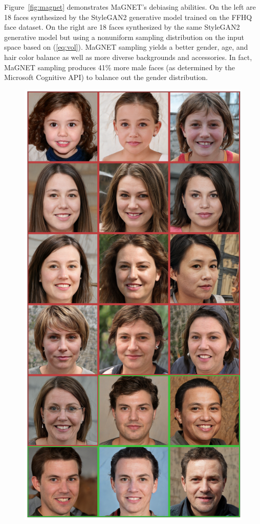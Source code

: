 \documentclass{notices}
\begin{document}
Figure~\ref{fig:magnet} demonstrates MaGNET's debiasing abilities.
On the left are 18 faces synthesized by the StyleGAN2 generative model trained on the FFHQ face dataset.
On the right are 18 faces synthesized by the same StyleGAN2 generative model but using a nonuniform sampling distribution on the input space based on (\ref{eq:vol}).
MaGNET sampling yields a better gender, age, and hair color balance as well as more diverse backgrounds and accessories.
In fact, MaGNET sampling produces 41\% more male faces (as determined by the Microsoft Cognitive API) to balance out the gender distribution. 


\begin{figure}[h]
    \centering
    \begin{minipage}{0.45\linewidth}
    \centering
    \includegraphics[width=\linewidth]{Figs/magnet_vanilla2_18.png}

\end{minipage}
\end{figure}
\end{document}
